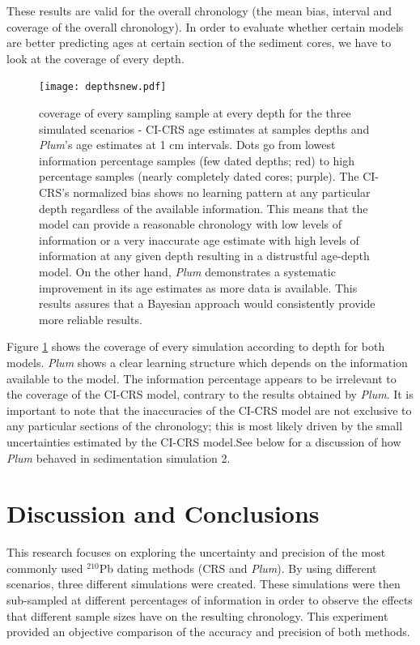 \documentclass [10pt] {article}
\begin{document}
These results are valid for the overall chronology (the mean bias, interval and coverage of the overall chronology). 
In order to evaluate whether certain models are better predicting ages at certain section of the sediment cores, we have to look at the coverage of every depth. 


\begin{figure}[!]
	\begin{centering}
		\texttt{[image: depthsnew.pdf]}
		\caption{coverage of every sampling sample at every depth for the three simulated scenarios - CI-CRS age estimates at samples depths and \textit{Plum}'s age estimates at 1 cm intervals. Dots go from lowest information percentage samples (few dated depths; red) to high percentage samples (nearly completely dated cores; purple). The CI-CRS's normalized bias shows no learning pattern at any particular depth regardless of the available information. This means that the model can provide a reasonable chronology with low levels of information or a very inaccurate age estimate with high levels of information at any given depth resulting in a distrustful age-depth model. On the other hand, \textit{Plum} demonstrates a systematic improvement in its age estimates as more data is available. This results assures that a Bayesian approach would consistently provide more reliable results.     }
		\label{fig:depths}
	\end{centering}
\end{figure}

Figure \ref{fig:depths} shows the coverage of every simulation according to depth for both models.
\textit{Plum} shows a clear learning structure which depends on the information available to the model.
The information percentage appears to be irrelevant to the coverage of the CI-CRS model, contrary to the results obtained by \textit{Plum}.
It is important to note that the inaccuracies of the CI-CRS model are not exclusive to any particular sections of the chronology; this is most likely driven by the small uncertainties estimated by the CI-CRS model.See below for a discussion of how \textit{Plum} behaved in sedimentation simulation 2.   



\section{Discussion and Conclusions}

This research focuses on exploring the uncertainty and precision of the most commonly used $^{210}$Pb dating methods (CRS and \textit{Plum}).
By using different scenarios, three different simulations were created.
These simulations were then sub-sampled at different percentages of information in order to observe the effects that different sample sizes have on the resulting chronology. 
This experiment provided an objective comparison of the accuracy and precision of both methods.
\end{document}
